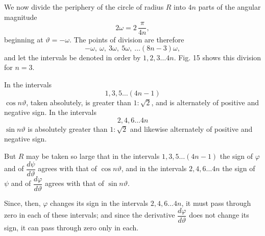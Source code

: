 
We now divide the periphery of the circle of radius $R$ into
$4n$ parts of the angular magnitude
\[
2\omega = 2\,\frac{\pi}{4n},
\]
beginning at $\vartheta = -\omega$. The points of division are therefore
\[
-\omega,\ \omega,\ 3\omega,\ 5\omega,\ \dots (8n - 3)\omega,
\]
and let the intervals be denoted in order by $1, 2, 3 \dots 4n$.
Fig. 15 shows this division for $n = 3$.


In the intervals
\[
1, 3, 5 \dots (4n - 1)
\]
$\cos n\vartheta$, taken absolutely, is greater than $1 : \sqrt{2}$, and
is alternately of positive and negative sign. In the
intervals
\[
2, 4, 6 \dots 4n
\]
$\sin n\vartheta$ is absolutely greater than $1 : \sqrt{2}$ and likewise
alternately of positive and negative sign.

But $R$ may be taken so large that in the intervals
$1, 3, 5 \dots (4n - 1)$ the sign of $\varphi$ and of $\dfrac{d\psi}{d\vartheta}$ agrees with that
of $\cos n\vartheta$, and in the intervals $2, 4, 6 \dots 4n$ the sign
of $\psi$ and of $\dfrac{d\varphi}{d\vartheta}$ agrees with that of $\sin n\vartheta$.

Since, then, $\varphi$ changes its sign in the intervals $2, 4, 6 \dots 4n$,
it must pass through zero in each of these intervals;
and since the derivative $\dfrac{d\varphi}{d\vartheta}$ does not change its sign, it can
pass through zero only  in each.
